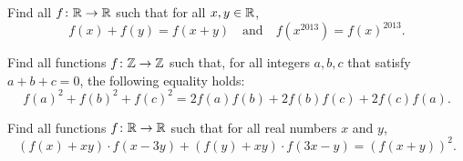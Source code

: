 \documentclass[11pt]{scrartcl}
\begin{document}
\begin{problem}
  Find all $f\colon \mathbb R \to \mathbb R$ such that for all $x,y\in \mathbb R$,
  \[ f(x)+f(y) = f(x+y) \quad\text{and}\quad f(x^{2013}) = f(x)^{2013}. \]
\end{problem}

\begin{problem}
  [IMO 2012/4]
  Find all functions $f\colon \mathbb Z \to \mathbb Z$ such that,
  for all integers $a,b,c$ that satisfy $a+b+c=0$, the following equality holds:
  \[f(a)^2+f(b)^2+f(c)^2=2f(a)f(b)+2f(b)f(c)+2f(c)f(a).\]
\end{problem}

\begin{problem}
  [USAMO 2016/4]
  Find all functions $f\colon \mathbb R \to \mathbb R$
  such that for all real numbers $x$ and $y$,
  \[ (f(x)+xy)\cdot f(x-3y)+(f(y)+xy)\cdot f(3x-y)=(f(x+y))^2. \]
\end{problem}
\end{document}
